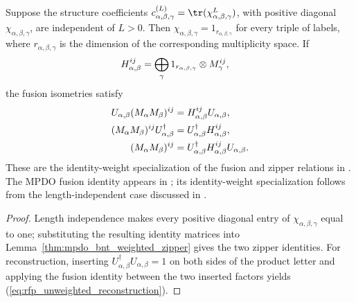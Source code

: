 \begin{lemma}%
    \label{thm:mpdo_bnt_length_independent_zipper}
    \leanok
    Suppose the structure coefficients
    $c_{\alpha,\beta,\gamma}^{(L)}
        =\tr(\chi_{\alpha,\beta,\gamma}^{L})$, with positive diagonal
    $\chi_{\alpha,\beta,\gamma}$, are independent of $L>0$. Then
    $\chi_{\alpha,\beta,\gamma}=1_{r_{\alpha,\beta,\gamma}}$ for every triple
    of labels, where $r_{\alpha,\beta,\gamma}$ is the dimension of the
    corresponding multiplicity space. If
    \begin{align}
        H_{\alpha,\beta}^{ij}
         & =
        \bigoplus_\gamma
        1_{r_{\alpha,\beta,\gamma}}\otimes M_\gamma^{ij},
        \notag
    \end{align}
    the fusion isometries satisfy
    \begin{align}
        U_{\alpha,\beta}(M_\alpha M_\beta)^{ij}
         & =H_{\alpha,\beta}^{ij}U_{\alpha,\beta},
        \notag                                              \\
        (M_\alpha M_\beta)^{ij}U_{\alpha,\beta}^\dagger
         & =U_{\alpha,\beta}^\dagger H_{\alpha,\beta}^{ij},
        \notag                                              \\
        (M_\alpha M_\beta)^{ij}
         & =U_{\alpha,\beta}^\dagger
        H_{\alpha,\beta}^{ij}U_{\alpha,\beta}.
        \label{eq:rfp_unweighted_reconstruction}
    \end{align}
    These are the identity-weight specialization of the fusion and zipper
    relations in
    \cite[Section~3]{Bultinck2017Anyons}. The MPDO fusion identity appears in
    \cite[Theorem~4.14(iii), lines~986--991]{Cirac2016MPDO_arXiv}; its
    identity-weight specialization follows from the length-independent case
    discussed in \cite[line~1010]{Cirac2016MPDO_arXiv}.
\end{lemma}
\begin{proof}\leanok
    Length independence makes every positive diagonal entry of
    $\chi_{\alpha,\beta,\gamma}$ equal to one; substituting the resulting
    identity matrices into
    Lemma~\ref{thm:mpdo_bnt_weighted_zipper} gives the two zipper
    identities. For reconstruction, inserting
    $U_{\alpha,\beta}^\dagger U_{\alpha,\beta}=1$ on both sides of the product
    letter and applying the fusion identity between the two inserted factors
    yields (\ref{eq:rfp_unweighted_reconstruction}).
\end{proof}

